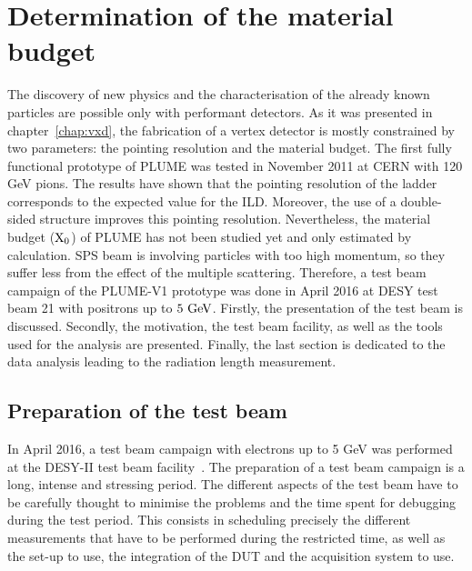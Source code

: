 \chapter{Determination of the material budget}
\label{chap:X0}

  The discovery of new physics and the characterisation of the already known particles are possible only with performant detectors.
  As it was presented in chapter~\ref{chap:vxd}, the fabrication of a vertex detector is mostly constrained by two parameters: the pointing resolution and the material budget.
  The first fully functional prototype of \gls{PLUME} was tested in November 2011 at CERN with 120 GeV pions.
  The results have shown that the pointing resolution of the ladder corresponds to the expected value for the \gls{ILD}.
  Moreover, the use of a double-sided structure improves this pointing resolution. 
  Nevertheless, the material budget ($\rm{X_0}$) of \gls{PLUME} has not been studied yet and only estimated by calculation.
  SPS beam is involving particles with too high momentum, so they suffer less from the effect of the multiple scattering.
  Therefore, a test beam campaign of the PLUME-V1 prototype was done in April 2016 at DESY test beam 21 with positrons up to $5~\rm{GeV}$.
  Firstly, the presentation of the test beam is discussed.
  Secondly, the motivation, the test beam facility, as well as the tools used for the analysis are presented.
  Finally, the last section is dedicated to the data analysis leading to the radiation length measurement.

\minitoc

  \section{Preparation of the test beam}

  In April 2016, a test beam campaign with electrons up to 5 GeV was performed at the DESY-II test beam facility~\cite{DESYII}.
  The preparation of a test beam campaign is a long, intense and stressing period.
  The different aspects of the test beam have to be carefully thought to minimise the problems and the time spent for debugging during the test period.
  This consists in scheduling precisely the different measurements that have to be performed during the restricted time, as well as the set-up to use, the integration of the \gls{DUT} and the acquisition system to use.
  
